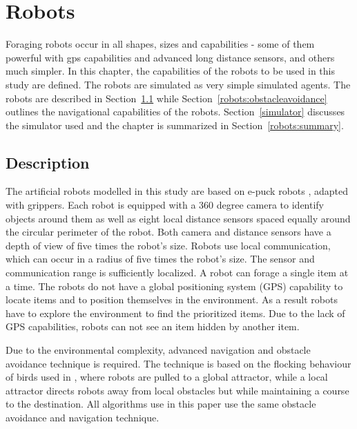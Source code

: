 
\chapter{Robots}
\label{chap:robots}

Foraging robots occur in all shapes, sizes and capabilities - some of them powerful with gps capabilities and advanced long distance sensors, and others much simpler. In this chapter, the capabilities of the robots to be used in this study are defined. The robots are simulated as very simple simulated agents. The robots are described in Section~\ref{robotdescription} while Section~\ref{robots:obstacleavoidance} outlines the navigational capabilities of the robots. Section~\ref{simulator} discusses the simulator used and the chapter is summarized in Section~\ref{robots:summary}.

\section{Description}
\label{robotdescription}

The artificial robots modelled in this study are based on e-puck robots \cite{mondada2009puck}, adapted with grippers. Each robot is equipped with a 360 degree camera to identify objects around them as well as eight local distance sensors spaced equally around the circular perimeter of the robot. Both camera and distance sensors have a depth of view of five times the robot's size. Robots use local communication, which can occur in a radius of five times the robot's size. The sensor and communication range is sufficiently localized. A robot can forage a single item at a time. The robots do not have a global positioning system (GPS) capability to locate items and to position themselves in the environment. As a result robots have to explore the environment to find the prioritized items. Due to the lack of GPS capabilities, robots can not see an item hidden by another item.

Due to the environmental complexity, advanced navigation and obstacle avoidance technique is required. The technique is based on the flocking behaviour of birds used in \cite{antoniou2012congestion}, where robots are pulled to a global attractor, while a local attractor directs robots away from local obstacles but while maintaining a course to the destination. All algorithms use in this paper use the same obstacle avoidance and navigation technique. 


